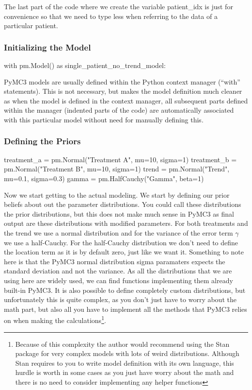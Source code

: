 \documentclass[12pt,a4paper,leqno]{report}
\theoremstyle{plain}
\theoremstyle{definition}
\theoremstyle{remark}
\begin{document}
The last part of the code where we create the variable patient\_idx is just for
convenience so that we need to type less when referring to the data of a particular patient.

\subsubsection{Initializing the Model}

\bigskip
\begin{pyverbatim}
with pm.Model() as single_patient_no_trend_model:
\end{pyverbatim}
\bigskip

PyMC3 models are usually defined within the Python context manager (``with'' statements).
This is not necessary, but makes the model definition much cleaner as when the model is
defined in the context manager, all subsequent parts defined within the manager
(indented parts of the code) are automatically associated with this particular model
without need for manually defining this.

\subsubsection{Defining the Priors}

\bigskip
\begin{pyverbatim}
treatment_a = pm.Normal("Treatment A", mu=10, sigma=1)
treatment_b = pm.Normal("Treatment B", mu=10, sigma=1)
trend = pm.Normal("Trend", mu=0.1, sigma=0.3)
gamma = pm.HalfCauchy("Gamma", beta=1)
\end{pyverbatim}
\bigskip

Now we start getting to the actual modeling. We start by defining our prior beliefs about
out the parameter distributions. You could call these distributions the prior
distributions, but this does not make much sense in PyMC3 as final output are these
distributions with modified parameters. For both treatments and the trend we use a normal distribution and
for the variance of the error term \(\gamma \) we use a half-Cauchy. For the half-Cauchy
distribution we don't need to define the location term as it is by default zero, just
like we want it. Something to note here is that the PyMC3 normal distribution sigma
paramaters expects the standard deviation and not the variance. As all the distributions
that we are using here are widely used, we can find functions implementing
them already built-in PyMC3. It is also possible to define completely custom
distributions, but unfortunately this is quite complex, as you don't just have to worry
about the math part, but also all you have to implement all the methods that PyMC3
relies on when making the calculations\footnote{Because of this complexity the author would recommend using the Stan package for very complex models with lots of weird
distributions. Although Stan requires to you to write model definition with its own
language, this hurdle is worth in some cases as you just have
worry about the math and there is no need to consider implementing any helper functions}.
\end{document}

